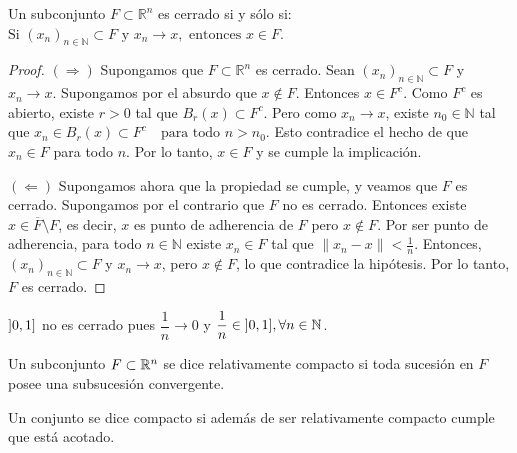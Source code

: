 \begin{theorem}
  Un subconjunto \(F \subset \mathbb{R}^n\) es cerrado si y sólo si:
  \(\text{Si } {(x_n)}_{n \in \mathbb{N}} \subset F \text{ y } x_n \to x, \text{ entonces } x \in F\).
  \begin{proof}
    \((\Rightarrow)\) Supongamos que \(F \subset \mathbb{R}^n\) es cerrado.
    Sean \({(x_n)}_{n \in \mathbb{N}} \subset F\) y \(x_n \to x\).
    Supongamos por el absurdo que \(x \notin F\). Entonces \(x \in F^c\).
    Como \(F^c\) es abierto, existe \(r > 0\) tal que \(B_r(x) \subset F^c\).
    Pero como \(x_n \to x\), existe \(n_0 \in \mathbb{N} \) tal que
    \(x_n \in B_r(x) \subset F^c \quad \text{para todo } n > n_0\).
    Esto contradice el hecho de que \(x_n \in F\) para todo \(n\).
    Por lo tanto, \(x \in F\) y se cumple la implicación.

    \medskip

    \((\Leftarrow)\) Supongamos ahora que la propiedad se cumple, y veamos que \(F\) es cerrado.
    Supongamos por el contrario que \(F\) no es cerrado. Entonces existe \(x \in \overline{F} \setminus F\),
    es decir, \(x\) es punto de adherencia de \(F\) pero \(x \notin F\).
    Por ser punto de adherencia, para todo \(n \in \mathbb{N} \) existe \(x_n \in F\) tal que
    \( \|x_n - x\| < \frac{1}{n}\).
    Entonces, \({(x_n)}_{n \in \mathbb{N}} \subset F\) y \(x_n \to x\), pero \(x \notin F\),
    lo que contradice la hipótesis. Por lo tanto, \(F\) es cerrado.
  \end{proof}
\end{theorem}

\begin{eg}
  \( \interval[open left]{0}{1}\) no es cerrado pues \(\dfrac{1}{n} \to 0\) y \(\dfrac{1}{n} \in \interval[open left]{0}{1}, \forall n \in \N \).
\end{eg}

\begin{definition}
  Un subconjunto \(F \subset \mathbb{R}^n\) se dice relativamente compacto si toda sucesión en \(F\) posee una subsucesión convergente.
\end{definition}

\begin{definition}[Compacto]
  Un conjunto se dice compacto si además de ser relativamente compacto cumple que está acotado.
\end{definition}

\clearpage

